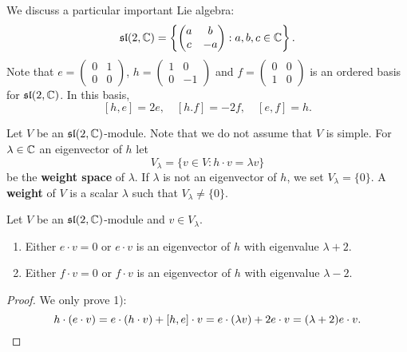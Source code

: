 \chapter{}



We discuss a particular important Lie algebra: 
\[
\mathfrak{sl}(2,\mathbb{C})=\left\{\begin{pmatrix}
    a & b\\
    c & -a
    \end{pmatrix}:a,b,c\in\mathbb{C}\right\}.
\]
Note that 
$e=\begin{pmatrix}
        0&1\\
        0&0\end{pmatrix}$, $h=\begin{pmatrix}
        1&0\\
        0&-1\end{pmatrix}$ and $f=\begin{pmatrix}0&0\\1&0\end{pmatrix}$ 
        is an ordered basis for $\mathfrak{sl}(2,\mathbb{C})$. In this basis,
\[
[h,e]=2e,\quad
[h.f]=-2f,\quad
[e,f]=h.
\]

Let $V$ be an $\mathfrak{sl}(2,\mathbb{C})$-module. Note that we do not assume that $V$ is simple. 
For $\lambda\in\mathbb{C}$ an eigenvector of $h$ let
\[
V_{\lambda}=\{v\in V:h\cdot v=\lambda v\}
\]
be the \textbf{weight space} of $\lambda$. 
If $\lambda$ is not an eigenvector of $h$, 
we set $V_{\lambda}=\{0\}$. A \textbf{weight} of $V$  
is a scalar $\lambda$ such that $V_{\lambda}\ne\{0\}$. 

\begin{lemma}
    Let $V$ be an $\mathfrak{sl}(2,\mathbb{C})$-module and $v\in V_{\lambda}$. 
    \begin{enumerate}
        \item Either $e\cdot v=0$ or $e\cdot v$ is an eigenvector of $h$ with
            eigenvalue $\lambda+2$.
        \item Either $f\cdot v=0$ or $f\cdot v$ is an eigenvector of $h$ with
            eigenvalue $\lambda-2$.
    \end{enumerate} 
\end{lemma}

\begin{proof}
    We only prove 1):
    \[h\cdot(e\cdot v)=e\cdot(h\cdot v)+[h,e]\cdot v=e\cdot(\lambda v)+2e\cdot v=(\lambda+2)e\cdot v.\qedhere
    \]
\end{proof}

